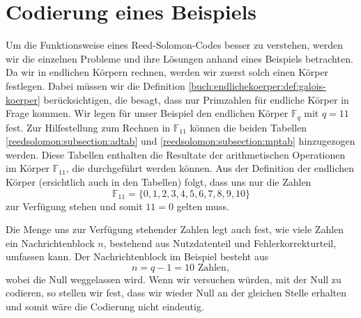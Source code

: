 %
%
%
\section{Codierung eines Beispiels
\label{reedsolomon:section:codebsp}}

Um die Funktionsweise eines Reed-Solomon-Codes besser zu verstehen, werden wir die einzelnen Probleme und ihre Lösungen anhand eines Beispiels betrachten.
Da wir in endlichen Körpern rechnen, werden wir zuerst solch einen Körper festlegen. Dabei müssen wir die Definition \ref{buch:endlichekoerper:def:galois-koerper} berücksichtigen, die besagt, dass nur Primzahlen für endliche Körper in Frage kommen.
Wir legen für unser Beispiel den endlichen Körper $\mathbb{F}_{q}$ mit $q = 11$ fest.
Zur Hilfestellung zum Rechnen in $\mathbb{F}_{11}$ können die beiden Tabellen \ref{reedsolomon:subsection:adtab} und \ref{reedsolomon:subsection:mptab} hinzugezogen werden. Diese Tabellen enthalten die Resultate der arithmetischen Operationen im Körper $\mathbb{F}_{11}$, die durchgeführt werden können.
Aus der Definition der endlichen Körper (ersichtlich auch in den Tabellen) folgt, dass uns nur die Zahlen \[\mathbb{F}_{11} = \{0,1,2,3,4,5,6,7,8,9,10\}\] zur Verfügung stehen und somit $11 = 0$ gelten muss.


%
%

Die Menge uns zur Verfügung stehender Zahlen legt auch fest, wie viele Zahlen ein Nachrichtenblock $n$, bestehend aus Nutzdatenteil und Fehlerkorrekturteil, umfassen kann.
Der Nachrichtenblock im Beispiel besteht aus
\[
n = q - 1 = 10 \text{ Zahlen},
\]
wobei die Null weggelassen wird. Wenn wir versuchen würden, mit der Null zu codieren, so stellen wir fest, dass wir wieder Null an der gleichen Stelle erhalten und somit wäre die Codierung nicht eindeutig.




